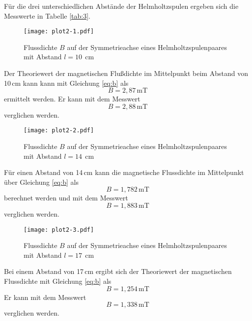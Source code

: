 Für die drei unterschiedlichen Abstände der Helmholtzspulen
ergeben sich die Messwerte in Tabelle \ref{tab:3}. 
\begin{figure}[H]
\centering

  \texttt{[image: plot2-1.pdf]}
  \caption{Flussdichte $B$ auf der Symmetrieachse eines Helmholtzspulenpaares mit Abstand $l=10\:\:\si{\centi\meter}$}
\end{figure}
\noindent Der Theoriewert der magnetischen Flußdichte im Mittelpunkt
beim Abstand von 10\,cm kann kann mit Gleichung \ref{eq:b}
als
  \begin{equation}
    B=2,87\,\si{\milli\tesla}\nonumber
  \end{equation}
\noindent ermittelt werden. Er kann mit dem Messwert 
\begin{equation}
    B=2,88\,\si{\milli\tesla}\nonumber
  \end{equation}
\noindent verglichen werden. 
\begin{figure}[H]
\centering
  \texttt{[image: plot2-2.pdf]}
    \caption{Flussdichte $B$ auf der Symmetrieachse eines Helmholtzspulenpaares mit Abstand $l=14\:\:\si{\centi\meter}$}

\end{figure}
\noindent Für einen Abstand von 14\,cm kann die magnetische
Flussdichte im Mittelpunkt über Gleichung \ref{eq:b}
als
  \begin{equation}
    B=1,782\,\si{\milli\tesla}\nonumber
  \end{equation}
\noindent berechnet werden und mit dem Messwert  
\begin{equation}
    B= 1,883\,\si{\milli\tesla}\nonumber
  \end{equation}
\noindent verglichen werden. 
\begin{figure}[H]
\centering
  \texttt{[image: plot2-3.pdf]}
    \caption{Flussdichte $B$ auf der Symmetrieachse eines Helmholtzspulenpaares mit Abstand $l=17\:\:\si{\centi\meter}$}
\end{figure}
\noindent Bei einem Abstand von 17\,cm ergibt sich
der Theoriewert der magnetischen Flussdichte mit
Gleichung \ref{eq:b} als
  \begin{equation}
    B=1,254\,\si{\milli\tesla}\nonumber
  \end{equation}
\noindent Er kann mit dem Messwert 
\begin{equation}
    B=1,338\,\si{\milli\tesla}\nonumber
  \end{equation}
\noindent verglichen werden. 


